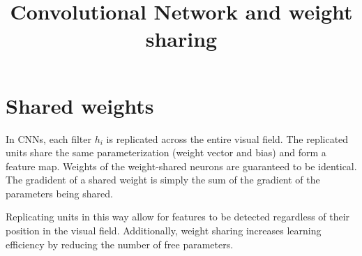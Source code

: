 \documentclass{ctexart}
\begin{document}
\setlength{\parindent}{0pt}

\title{Convolutional Network and weight sharing}
\maketitle

\section{Shared weights}
In CNNs, each filter $h_i$ is replicated across the entire visual field. The replicated units
share the same parameterization (weight vector and bias) and form a feature map. Weights of the
weight-shared neurons are guaranteed to be identical. The gradident of a shared weight is simply
the sum of the gradient of the parameters being shared.

Replicating units in this way allow for features to be detected regardless of their position in
the visual field. Additionally, weight sharing increases learning efficiency by reducing the number
of free parameters.
\end{document}
